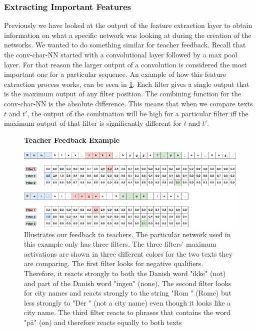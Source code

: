 \subsubsection{Extracting Important Features}

Previously we have looked at the output of the feature extraction layer to
obtain information on what a specific network was looking at during the
creation of the networks. We wanted to do something similar for teacher
feedback. Recall that the \gls{conv-char-NN} started with a convolutional
layer followed by a max pool layer. For that reason the larger output of a
convolution is considered the most important one for a particular sequence.
An example of how this feature extraction process works, can be seen in
\ref{fig:feature_extraction_output_example}. Each filter gives a single output
that is the maximum output of any filter position. The combining function for
the \gls{conv-char-NN} is the absolute difference. This means that when we
compare texts $t$ and $t'$, the output of the combination will be high for
a particular filter iff the maximum output of that filter is significantly
different for $t$ and $t'$.

\begin{figure}
    \centering
    \textbf{Teacher Feedback Example}\par\medskip
    \includegraphics[width=\textwidth]{./pictures/discussion/teacher_feedback_example}
    \caption{Illustrates our feedback to teachers. The particular network
    used in this example only has three filters. The three filters' maximum
    activations are shown in three different colors for the two texts they are
    comparing. The first filter looks for negative qualifiers. Therefore, it
    reacts strongly to both the Danish word "ikke" (not) and part of the Danish
    word "ingen" (none). The second filter looks for city names and reacts
    strongly to the string "Rom " (Rome) but less strongly to "Der " (not a city
    name) even though it looks like a city name. The third filter reacts to
    phrases that contains the word "p\aa " (on) and therefore reacts equally to
    both texts}
    \label{fig:feature_extraction_output_example}
\end{figure}

